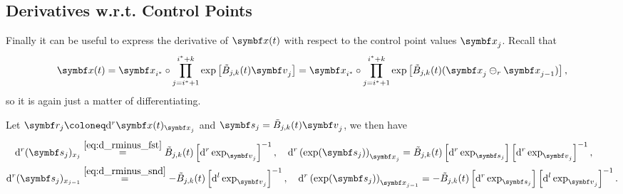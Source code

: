 \subsection{Derivatives w.r.t. Control Points}

Finally it can be useful to express the derivative of $\x(t)$ with respect to the control point values $\x_j$. Recall that
\begin{equation}
  \x(t) = \x_{i^*} \circ \prod_{j = i^* + 1}^{i^* + k} \exp \left[ \tilde B_{j, k}(t) \bv_j \right] = \x_{i^*} \circ \prod_{j = i^* + 1}^{i^* + k} \exp \left[ \tilde B_{j, k}(t) (\x_j \ominus_r \x_{j-1}) \right],
\end{equation}
so it is again just a matter of differentiating.

Let $\symbf r_j \coloneq \mathrm{d}^r \x(t)_{\x_j}$ and $\symbf s_j = \tilde B_{j, k}(t) \bv_j$, we then have
\begin{equation}
  \begin{aligned}
    \mathrm{d}^r (\symbf s_j)_{x_j}     & \overset{\eqref{eq:d_rminus_fst}} = \tilde B_{j, k}(t) \left[ \mathrm{d}^r \exp_{\bv_j} \right]^{-1}, \quad \mathrm{d}^r \left(\exp (\symbf s_j) \right)_{\x_j} = \tilde B_{j, k}(t) \left[\mathrm{d}^r \exp_{\symbf s_j} \right]  \left[ \mathrm{d}^r \exp_{\bv_j} \right]^{-1},         \\
    \mathrm{d}^r (\symbf s_j)_{x_{j-1}} & \overset{\eqref{eq:d_rminus_snd}} = - \tilde B_{j, k}(t) \left[ \mathrm{d}^l \exp_{\bv_j} \right]^{-1}, \quad \mathrm{d}^r \left( \exp(\symbf s_j) \right)_{\x_{j-1}} = - \tilde B_{j, k}(t)  \left[ \mathrm{d}^r \exp_{\symbf s_j} \right]\left[ \mathrm{d}^l \exp_{\bv_j} \right]^{-1}.
  \end{aligned}
\end{equation}


